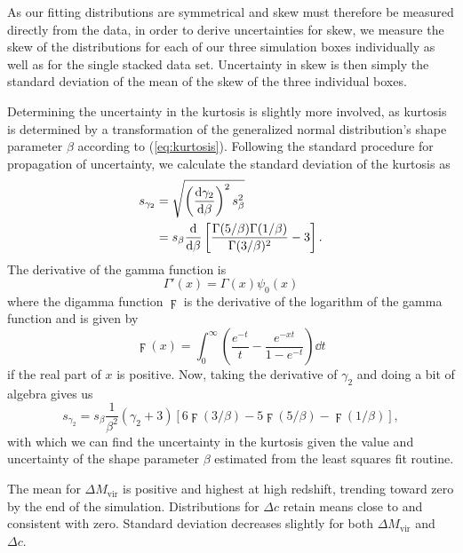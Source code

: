 As our fitting distributions are symmetrical and skew must therefore be measured directly from the data, in order to derive uncertainties for skew, we measure the skew of the distributions for each of our three simulation boxes individually as well as for the single stacked data set.  Uncertainty in skew is then simply the standard deviation of the mean of the skew of the three individual boxes.

Determining the uncertainty in the kurtosis is slightly more involved, as kurtosis is determined by a transformation of the generalized normal distribution's shape parameter $\beta$ according to (\ref{eq:kurtosis}).  Following the standard procedure for propagation of uncertainty, we calculate the standard deviation of the kurtosis as
\begin{align} \label{eq:kurt_err_partial}
    s_{\gamma_{2}} &= \sqrt{ \left( \frac{{\rm {d}} \gamma_{2}}{{\rm {d}} \beta} \right)^{2} s_{\beta}^{2} } \\
        &= s_{\beta} \frac{{\rm {d}}}{{\rm {d}} \beta} \left[ \frac{\Gamma(5/\beta) \Gamma(1/\beta)}{\Gamma(3/\beta)^{2}} - 3 \right].
\end{align}
The derivative of the gamma function is
\begin{equation} \label{eq:gamma_prime}
    \Gamma'(x) = \Gamma(x) \psi_{0}(x)
\end{equation}
where the digamma function $\digamma$ is the derivative of the logarithm of the gamma function and is given by
\begin{equation} \label{eq:digamma}
    \digamma(x) = \int_{0}^{\infty} \left( \frac{e^{-t}}{t} - \frac{e^{-xt}}{1 - e^{-t}} \right) \dd t
\end{equation}
if the real part of $x$ is positive.  Now, taking the derivative of $\gamma_{2}$ and doing a bit of algebra gives us
\begin{equation} \label{eq:kurt_err}
    s_{\gamma_{2}} = s_{\beta} \frac{1}{\beta^{2}} \left( \gamma_{2} + 3 \right) \left[ 6 \digamma(3/\beta) - 5 \digamma(5/\beta) - \digamma(1/\beta) \right],
\end{equation}
with which we can find the uncertainty in the kurtosis given the value and uncertainty of the shape parameter $\beta$ estimated from the least squares fit routine.

The mean for $\Delta M_{\mathrm{vir}}$ is positive and highest at high redshift, trending toward zero by the end of the simulation.  Distributions for $\Delta c$ retain means close to and consistent with zero.  Standard deviation decreases slightly for both $\Delta M_{\mathrm{vir}}$ and $\Delta c$.

